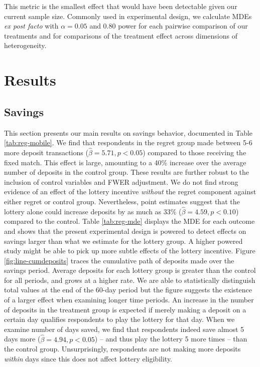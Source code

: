 \documentclass[10pt]{article}
\begin{document}
		This metric is the smallest effect that would have been detectable given our current sample size. Commonly used in experimental design, we calculate MDEs \textit{ex post facto} with $\alpha = 0.05$ and 0.80 power for each pairwise comparison of our treatments and for comparisons of the treatment effect across dimensions of heterogeneity.

\section{Results} \label{sec:results}

	\subsection{Savings}

		This section presents our main results on savings behavior, documented in Table \ref{tab:reg-mobile}. We find that respondents in the regret group made between 5-6 more deposit transactions ($\hat \beta = 5.71, p < 0.05$) compared to those receiving the fixed match. This effect is large, amounting to a 40\% increase over the average number of deposits in the control group. These results are further robust to the inclusion of control variables and FWER adjustment. We do not find strong evidence of an effect of the lottery incentive \textit{without} the regret component against either regret or control group. Nevertheless, point estimates suggest that the lottery alone could increase deposits by as much as 33\% ($\hat \beta = 4.59, p < 0.10$) compared to the control. Table \ref{tab:reg-mde} displays the MDE for each outcome and shows that the present experimental design is powered to detect effects on savings larger than what we estimate for the lottery group. A higher powered study might be able to pick up more subtle effects of the lottery incentive. Figure \ref{fig:line-cumdeposits} traces the cumulative path of deposits made over the savings period. Average deposits for each lottery group is greater than the control for all periods, and grows at a higher rate. We are able to statistically distinguish total values at the end of the 60-day period but the figure suggests the existence of a larger effect when examining longer time periods. An increase in the number of deposits in the treatment group is expected if merely making a deposit on a certain day qualifies respondents to play the lottery for that day. When we examine number of days saved, we find that respondents indeed save almost 5 days more ($\hat \beta = 4.94, p < 0.05$) -- and thus play the lottery 5 more times -- than the control group. Unsurprisingly, respondents are not making more deposits \textit{within} days since this does not affect lottery eligibility.
\end{document}
